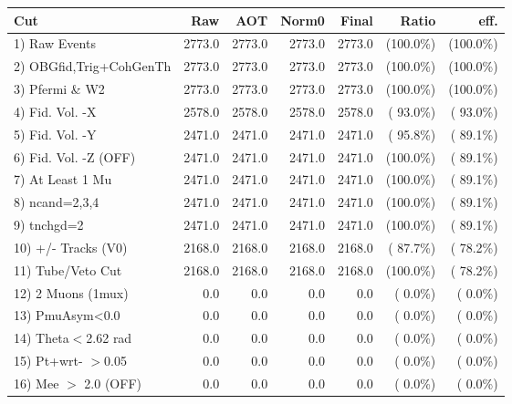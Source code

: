  \begin{table}[h!]\centering
 \begin{tabular}{||l||r|r|r|r|r|r||}
 \hline
 \hline
 Cut & Raw & AOT & Norm0 & Final & Ratio & eff.       \\
 \hline
  1) Raw Events           &       2773.0 &       2773.0 &       2773.0 &       2773.0 & (100.0\%) & (100.0\%) \\
  2) OBGfid,Trig+CohGenTh &       2773.0 &       2773.0 &       2773.0 &       2773.0 & (100.0\%) & (100.0\%) \\
  3) Pfermi \& W2         &       2773.0 &       2773.0 &       2773.0 &       2773.0 & (100.0\%) & (100.0\%) \\
  4) Fid. Vol. -X         &       2578.0 &       2578.0 &       2578.0 &       2578.0 & ( 93.0\%) & ( 93.0\%) \\
  5) Fid. Vol. -Y         &       2471.0 &       2471.0 &       2471.0 &       2471.0 & ( 95.8\%) & ( 89.1\%) \\
  6) Fid. Vol. -Z (OFF)   &       2471.0 &       2471.0 &       2471.0 &       2471.0 & (100.0\%) & ( 89.1\%) \\
  7) At Least 1 Mu        &       2471.0 &       2471.0 &       2471.0 &       2471.0 & (100.0\%) & ( 89.1\%) \\
  8) ncand=2,3,4          &       2471.0 &       2471.0 &       2471.0 &       2471.0 & (100.0\%) & ( 89.1\%) \\
  9) tnchgd=2             &       2471.0 &       2471.0 &       2471.0 &       2471.0 & (100.0\%) & ( 89.1\%) \\
 10) +/- Tracks (V0)      &       2168.0 &       2168.0 &       2168.0 &       2168.0 & ( 87.7\%) & ( 78.2\%) \\
 11) Tube/Veto Cut        &       2168.0 &       2168.0 &       2168.0 &       2168.0 & (100.0\%) & ( 78.2\%) \\
 12) 2 Muons (1mux)       &          0.0 &          0.0 &          0.0 &          0.0 & (  0.0\%) & (  0.0\%) \\
 13) PmuAsym<0.0          &          0.0 &          0.0 &          0.0 &          0.0 & (  0.0\%) & (  0.0\%) \\
 14) Theta$<$2.62 rad     &          0.0 &          0.0 &          0.0 &          0.0 & (  0.0\%) & (  0.0\%) \\
 15) Pt+wrt- $>$0.05      &          0.0 &          0.0 &          0.0 &          0.0 & (  0.0\%) & (  0.0\%) \\
 16) Mee $>$ 2.0  (OFF)   &          0.0 &          0.0 &          0.0 &          0.0 & (  0.0\%) & (  0.0\%) \\

\end{tabular}
\end{table}
